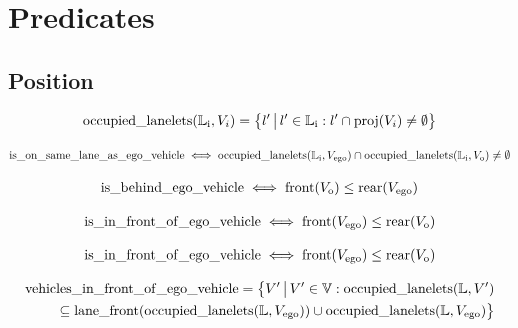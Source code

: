 
\section{Predicates}
\label{sec:predicates}

\subsection{Position}

\begin{align}
\operatorname*{occupied\_lanelets}(\mathbb{L}_\mathrm{i}, V_i) = \big\{l'   \, \big| \, l' \in \mathbb{L}_\mathrm{i}: l' \cap \operatorname*{proj}(V_i) \neq \emptyset \big\}
\end{align}

\begin{align}
\operatorname*{is\_on\_same\_lane\_as\_ego\_vehicle} \iff \operatorname*{occupied\_lanelets}(\mathbb{L}_\mathrm{i}, V_\text{ego}) \cap \operatorname*{occupied\_lanelets}(\mathbb{L}_\mathrm{i}, V_\text{o}) \neq \emptyset 
\end{align}

\begin{align}
\operatorname*{is\_behind\_ego\_vehicle} \iff \operatorname*{front}(V_\text{o}) \leq \operatorname*{rear}(V_\text{ego})
\end{align}

\begin{align}
\operatorname*{is\_in\_front\_of\_ego\_vehicle} \iff \operatorname*{front}(V_\text{ego}) \leq \operatorname*{rear}(V_\text{o})
\end{align}

\begin{align}
\operatorname*{is\_in\_front\_of\_ego\_vehicle} \iff \operatorname*{front}(V_\text{ego}) \leq \operatorname*{rear}(V_\text{o})
\end{align}

\begin{align}
\begin{split}
\operatorname*{vehicles\_in\_front\_of\_ego\_vehicle} = \big\{V'   \, \big| \, V' \in \mathbb{V}: \operatorname*{occupied\_lanelets}(\mathbb{L}, V') \\ \subseteq \operatorname*{lane\_front}(\operatorname*{occupied\_lanelets}(\mathbb{L}, V_\text{ego})) \cup \operatorname*{occupied\_lanelets}(\mathbb{L}, V_\text{ego})  \big\}
\end{split}
\end{align}


